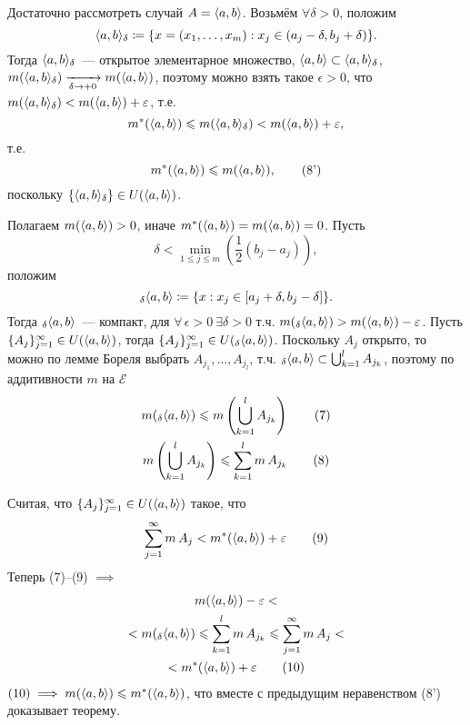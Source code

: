 \documentclass[main]{subfiles}
\begin{document}
\begin{longProof}
    Достаточно рассмотреть случай $A=\langle{a,b}\rangle$.
    Возьмём $\forall \delta>0$, положим
    \[\langle{a,b}\rangle_\delta\coloneq\{x=(x_1,\dotsc,x_m): x_j\in(a_j-\delta, b_j+\delta)\}.\]
    Тогда $\langle{a,b}\rangle_\delta$~--- открытое элементарное множество, $\langle{a,b}\rangle\subset\langle{a,b}\rangle_\delta$, $ m(\langle{a,b}\rangle_\delta) \xrightarrow[\delta \to +0]{} m(\langle{a,b}\rangle)$, поэтому можно взять такое $\epsilon>0$, что $m(\langle{a,b}\rangle_\delta)<m(\langle{a,b}\rangle)+\varepsilon$, т.е.
    \[m^*(\langle{a,b}\rangle)\leqslant m(\langle{a,b}\rangle_\delta)<m(\langle{a,b}\rangle)+\varepsilon,\]
    т.е.
    \[m^*(\langle{a,b}\rangle)\leqslant m(\langle{a,b}\rangle),\tag{8'}\]
    поскольку $\{ \langle{a,b}\rangle_\delta\}\in U(\langle{a,b}\rangle)$.

    Полагаем $m(\langle{a,b}\rangle)>0$, иначе $m^*(\langle{a,b}\rangle)=m(\langle{a,b}\rangle)=0$.
    Пусть
    \[\delta< \min_{1\le j\le m} \left(\frac{1}{2}(b_j-a_j) \right),\]
    положим
    \[_\delta\langle{a,b}\rangle\coloneq\{x:x_j\in[a_j+\delta, b_j-\delta]\}.\]
    Тогда $_\delta\langle{a,b}\rangle$~--- компакт, для $\forall\,\epsilon>0\ \exists\delta>0$ т.ч. $m({}_\delta\langle{a,b}\rangle)>m(\langle{a,b}\rangle)-\varepsilon$.
    Пусть $\{A_j\}_{j=1}^\infty\in U(\langle{a,b}\rangle)$, тогда $\{A_j\}_{j=1}^\infty\in U({}_\delta\langle{a,b}\rangle)$.
    Поскольку $A_j$ открыто, то можно по лемме Бореля выбрать $A_{j_1},\dotsc,A_{j_l}$, т.ч. ${}_\delta\langle{a,b}\rangle\subset \bigcup_{k=1}^l A_{j_k}$, поэтому по аддитивности $m$ на $\mathcal{E}$
    \begin{gather*}
        m(_\delta\langle{a,b}\rangle)\leqslant m \left(\bigcup_{k=1}^l A_{j_k} \right) \tag{7}\\
        m \left(\bigcup_{k=1}^l A_{j_k} \right)\leqslant\sum_{k=1}^l m\,A_{j_k}\tag{8}
    \end{gather*}

    Считая, что $\{A_j\}^\infty_{j=1}\in U(\langle{a,b}\rangle)$ такое, что
    \[ \sum_{j=1}^{\infty} m\,A_j<m^*(\langle{a,b}\rangle)+\varepsilon\tag{9} \]
    Теперь (7)--(9) $\implies$
    \begin{multline*}
        m(\langle{a,b}\rangle)-\varepsilon<\\
        <m({}_\delta\langle{a,b}\rangle)\leqslant\sum_{k=1}^l m\,A_{j_k}\leqslant\sum_{j=1}^{\infty}m\,A_j<\\
        <m^*(\langle{a,b}\rangle)+\varepsilon\tag{10}
    \end{multline*}
    $(10)\implies m(\langle{a,b}\rangle)\leqslant m^*(\langle{a,b}\rangle)$, что вместе с предыдущим неравенством (8') доказывает теорему.
\end{longProof}
\end{document}
